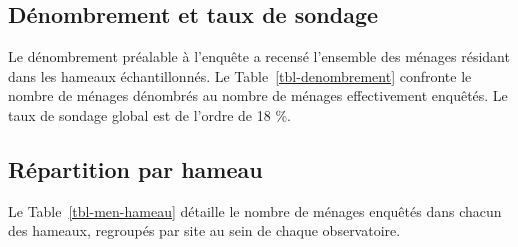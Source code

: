 \documentclass[
  french,
  letterpaper,
]{report}
\begin{document}
\subsection{Dénombrement et taux de
sondage}\label{duxe9nombrement-et-taux-de-sondage}

Le dénombrement préalable à l'enquête a recensé l'ensemble des ménages
résidant dans les hameaux échantillonnés. Le
Table~\ref{tbl-denombrement} confronte le nombre de ménages dénombrés au
nombre de ménages effectivement enquêtés. Le taux de sondage global est
de l'ordre de 18 \%.

\begin{table}

\caption{\label{tbl-denombrement}Dénombrement et taux de sondage par
observatoire}


\end{table}%

\subsection{Répartition par hameau}\label{ruxe9partition-par-hameau}

Le Table~\ref{tbl-men-hameau} détaille le nombre de ménages enquêtés
dans chacun des hameaux, regroupés par site au sein de chaque
observatoire.
\end{document}
